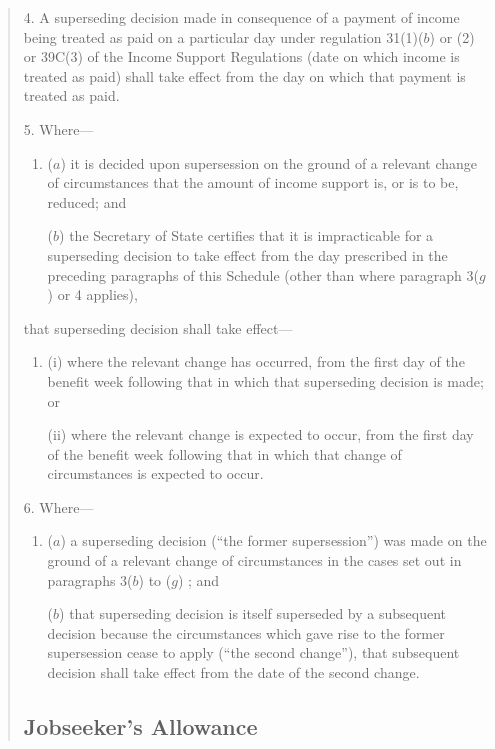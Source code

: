 \documentclass[12pt,a4paper]{article}
\begin{document}
\begin{quotation}
\medskip

4.  A superseding decision made in consequence of a payment of income being treated as paid on a particular day under regulation 31(1)($b$)  or (2) or 39C(3) of the Income Support Regulations (date on which income is treated as paid) shall take effect from the day on which that payment is treated as paid.

\medskip

5.  Where—
\begin{enumerate}\item[]
($a$) it is decided upon supersession on the ground of a relevant change of circumstances that the amount of income support is, or is to be, reduced; and

($b$) the Secretary of State certifies that it is impracticable for a superseding decision to take effect from the day prescribed in the preceding paragraphs of this Schedule (other than where paragraph 3($g$)  or 4 applies),
\end{enumerate}
that superseding decision shall take effect—
\begin{enumerate}\item[]
(i) where the relevant change has occurred, from the first day of the benefit week following that in which that superseding decision is made; or

(ii) where the relevant change is expected to occur, from the first day of the benefit week following that in which that change of circumstances is expected to occur.
\end{enumerate}

\medskip

6.  Where—
\begin{enumerate}\item[]
($a$) a superseding decision (“the former supersession”) was made on the ground of a relevant change of circumstances in the cases set out in paragraphs 3($b$)  to ($g$) ; and

($b$) that superseding decision is itself superseded by a subsequent decision because the circumstances which gave rise to the former supersession cease to apply (“the second change”), that subsequent decision shall take effect from the date of the second change.
\end{enumerate}

\subsection*{Jobseeker’s Allowance}


\end{quotation}
\end{document}
